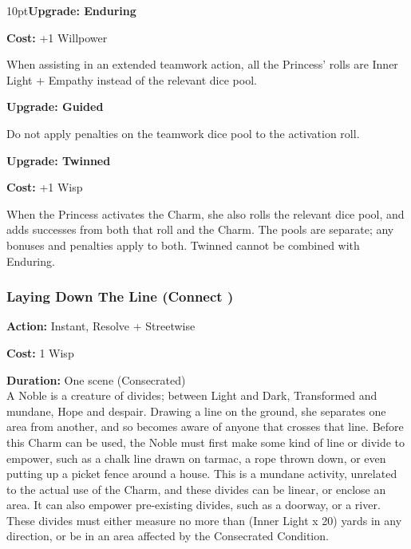 \begin{myindentpar}{10pt}\textbf{Upgrade: Enduring}

\noindent \textbf{Cost:} +1 Willpower

When assisting in an extended teamwork action, all the Princess' rolls are Inner Light + Empathy instead of the relevant dice pool.

\textbf{Upgrade: Guided}

Do not apply penalties on the teamwork dice pool to the activation roll.

\textbf{Upgrade: Twinned}

\noindent \textbf{Cost:} +1 Wisp

When the Princess activates the Charm, she also rolls the relevant dice pool, and adds successes from both that roll and the Charm. The pools are separate; any bonuses and penalties apply to both. Twinned cannot be combined with Enduring. \end{myindentpar}


\subsubsection*{Laying Down The Line (Connect \textbullet)}

\noindent \textbf{Action:} Instant, Resolve + Streetwise

\noindent \textbf{Cost:} 1 Wisp

\noindent \textbf{Duration:} One scene (Consecrated)\\

\noindent A Noble is a creature of divides; between Light and Dark, Transformed and mundane, Hope and despair. Drawing a line on the ground, she separates one area from another, and so becomes aware of anyone that crosses that line. Before this Charm can be used, the Noble must first make some kind of line or divide to empower, such as a chalk line drawn on tarmac, a rope thrown down, or even putting up a picket fence around a house. This is a mundane activity, unrelated to the actual use of the Charm, and these divides can be linear, or enclose an area. It can also empower pre-existing divides, such as a doorway, or a river. These divides must either measure no more than (Inner Light x 20) yards in any direction, or be in an area affected by the Consecrated Condition.

